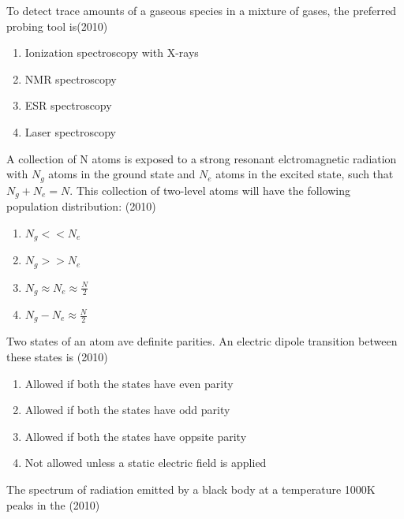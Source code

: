 
\iffalse
\chapter{2010}
\author{AI24BTECH11008}
\section{ph}
\fi

    \item To detect trace amounts of a gaseous species in a mixture of gases, the preferred probing tool is\hfill (2010)
    \begin{enumerate}[label=(\Alph*)]
        \item Ionization spectroscopy with X-rays
        \item NMR spectroscopy
        \item ESR spectroscopy
        \item Laser spectroscopy
    \end{enumerate}
    \item A collection of N atoms is exposed to a strong resonant elctromagnetic radiation with $N_g$ atoms in the ground state and $N_e$ atoms in the excited state, such that $N_g+N_e = N$. This collection of two-level atoms will have the following population distribution: \hfill (2010)
    \begin{enumerate}[label=(\Alph*)]
        \item $N_g<<N_e$
        \item $N_g>>N_e$
        \item $N_g\approx N_e\approx \frac{N}{2}$
        \item $N_g-N_e\approx \frac{N}{2}$
    \end{enumerate}
    \item Two states of an atom ave definite parities. An electric dipole transition between these states is \hfill (2010)
    \begin{enumerate}[label=(\Alph*)]
        \item Allowed if both the states have even parity
        \item Allowed if both the states have odd parity
        \item Allowed if both the states have oppsite parity
        \item Not allowed unless a static electric field is applied
    \end{enumerate}
    \item The spectrum of radiation emitted by a black body at a temperature 1000K peaks in the \hfill (2010)
